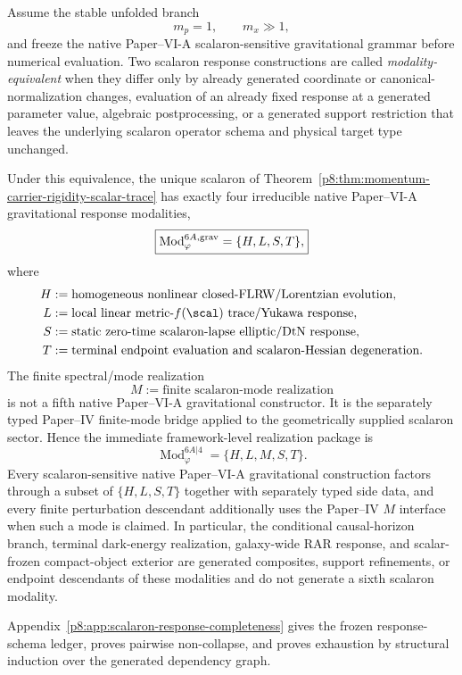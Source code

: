 \documentclass[12pt,a4paper]{article}
\begin{document}
\begin{theorem}
\label{p8:thm:scalaron-response-modality-completeness}
Assume the stable unfolded branch
\[
    m_p=1,
    \qquad
    m_x\gg1,
\]
and freeze the native Paper--VI-A scalaron-sensitive gravitational grammar
before numerical evaluation.  Two scalaron response constructions are called
\emph{modality-equivalent} when they differ only by already generated coordinate
or canonical-normalization changes, evaluation of an already fixed response at
a generated parameter value, algebraic postprocessing, or a generated support
restriction that leaves the underlying scalaron operator schema and physical
target type unchanged.

Under this equivalence, the unique scalaron of
Theorem~\ref{p8:thm:momentum-carrier-rigidity-scalar-trace} has exactly four
irreducible native Paper--VI-A gravitational response modalities,
\begin{equation}
\label{p8:eq:native-scalaron-response-modalities}
    \boxed{
    \operatorname{Mod}^{6A,\rm grav}_{\varphi}
    =\{H,L,S,T\},
    }
\end{equation}
where
\begin{align*}
H&:=\text{homogeneous nonlinear closed-FLRW/Lorentzian evolution},\\
L&:=\text{local linear metric-}f(\scal)\text{ trace/Yukawa response},\\
S&:=\text{static zero-time scalaron-lapse elliptic/DtN response},\\
T&:=\text{terminal endpoint evaluation and scalaron-Hessian degeneration}.
\end{align*}
The finite spectral/mode realization
\[
    M:=\text{finite scalaron-mode realization}
\]
is not a fifth native Paper--VI-A gravitational constructor.  It is the
separately typed Paper--IV finite-mode bridge applied to the geometrically
supplied scalaron sector.  Hence the immediate framework-level realization
package is
\begin{equation}
\label{p8:eq:framework-scalaron-response-modalities}
    \boxed{
    \operatorname{Mod}^{6A|4}_{\varphi}
    =\{H,L,M,S,T\}.
    }
\end{equation}
Every scalaron-sensitive native Paper--VI-A gravitational construction factors
through a subset of $\{H,L,S,T\}$ together with separately typed side data, and
every finite perturbation descendant additionally uses the Paper--IV $M$
interface when such a mode is claimed.  In particular, the conditional
causal-horizon branch, terminal dark-energy realization, galaxy-wide RAR
response, and scalar-frozen compact-object exterior are generated composites,
support refinements, or endpoint descendants of these modalities and do not
generate a sixth scalaron modality.

Appendix~\ref{p8:app:scalaron-response-completeness} gives the frozen
response-schema ledger, proves pairwise non-collapse, and proves exhaustion by
structural induction over the generated dependency graph.
\end{theorem}
\end{document}
